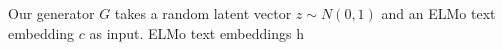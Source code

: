 Our generator $G$ takes a random latent vector $z \sim N(0, 1)$ and an ELMo text embedding $c$ as input. ELMo text embeddings h